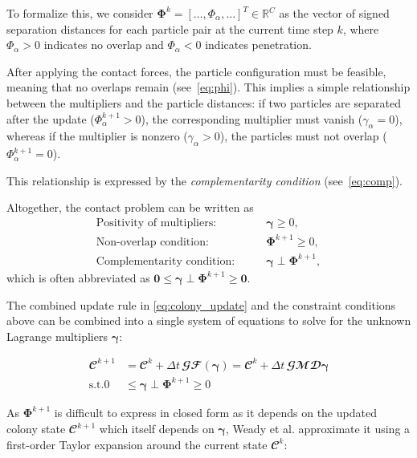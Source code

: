 \documentclass[conference]{IEEEtran}
\begin{document}
To formalize this, we consider $\mathbf{\Phi}^k = [\dots, \Phi_\alpha, \dots]^T \in \mathbb{R}^{C}$ as the vector of signed separation distances for each particle pair at the current time step $k$, where $\Phi_\alpha > 0$ indicates no overlap and $\Phi_\alpha < 0$ indicates penetration.

After applying the contact forces, the particle configuration must be feasible, meaning that no overlaps remain (see~\autoref{eq:phi}).
This implies a simple relationship between the multipliers and the particle distances: if two particles are separated after the update ($\Phi_\alpha^{k+1} > 0$), the corresponding multiplier must vanish ($\gamma_\alpha = 0$), whereas if the multiplier is nonzero ($\gamma_\alpha > 0$), the particles must not overlap ($\Phi_\alpha^{k+1} = 0$).

This relationship is expressed by the \emph{complementarity condition} (see~\autoref{eq:comp}).


Altogether, the contact problem can be written as
\begin{align}
    \text{Positivity of multipliers:} \qquad & \boldsymbol{\gamma} \geq 0, \label{eq:gamma}                   \\
    \text{Non-overlap condition:} \qquad     & \mathbf{\Phi}^{k+1} \geq 0, \label{eq:phi}                     \\
    \text{Complementarity condition:} \qquad & \boldsymbol{\gamma} \perp \mathbf{\Phi}^{k+1}, \label{eq:comp}
\end{align}
which is often abbreviated as $\mathbf{0} \leq \boldsymbol{\gamma} \perp \mathbf{\Phi}^{k+1} \geq \mathbf{0}$.


The combined update rule in \autoref{eq:colony_update} and the constraint conditions above can be combined into a single system of equations to solve for the unknown Lagrange multipliers $\boldsymbol{\gamma}$:

\begin{align}
    \mathbfcal{C}^{k+1} & = \mathbfcal{C}^k + \Delta t \, \mathbfcal{G}\mathbfcal{F}(\boldsymbol{\gamma}) = \mathbfcal{C}^k + \Delta t \, \mathbfcal{G}\mathbfcal{M} \mathbfcal{D} \boldsymbol{\gamma} \\
    \text{s.t.} 0       & \leq \boldsymbol{\gamma} \perp \mathbf{\Phi}^{k+1} \geq 0
\end{align}


As $\mathbf{\Phi}^{k+1}$ is difficult to express in closed form as it depends on the updated colony state $\mathbfcal{C}^{k+1}$ which itself depends on $\boldsymbol{\gamma}$, Weady et al. \cite{Weady2024} approximate it using a first-order Taylor expansion around the current state $\mathbfcal{C}^k$:
\end{document}
